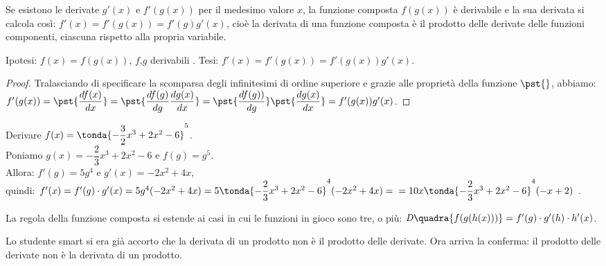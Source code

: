 \begin{teorema}
  \label{teo:diff01_dericomp}
 Se esistono le derivate $g'(x)$ e $f'(g(x))$ per il medesimo valore $x$,
 la funzione composta $f(g(x))$ è derivabile e la sua derivata si calcola
 così: $f'(x)=f'(g(x))=f'(g)g'(x)$, cioè la derivata di una funzione 
composta
 è il prodotto delle derivate delle funzioni componenti, ciascuna rispetto
 alla propria variabile.
\end{teorema}
\noindent Ipotesi: $f(x)=f(g(x))$, $f$,$g$ derivabili .\tab 
Tesi: $f'(x)=f'(g(x))=f'(g(x))g'(x)$.
\begin{proof}
  Tralasciando di specificare la scomparsa degli infinitesimi di ordine 
  superiore e grazie alle proprietà della funzione $\pst{}$, abbiamo:\\
  $f'(g(x))=\pst{\dfrac{df(x)}{dx}}=
  \pst{\dfrac{df(g)}{dg}\dfrac{dg(x)}{dx}}=
  \pst{\dfrac{df(g))}{dg}}\pst{\dfrac{dg(x)}{dx}}=
  f'(g(x))g'(x)$.
\end{proof}
\begin{esempio}
  Derivare $f(x)=\tonda{-\dfrac{3}{2}x^3+2x^2-6}^5$.\\
  Poniamo $g(x)=-\dfrac{2}{3}x^3+2x^2-6$ e $f(g)=g^5$. \\
  Allora: 
  $f'(g)= 5g^4$ e $g'(x)=-2x^2+4x$, \\
  quindi: 
  $f'(x)=f'(g)\cdot g'(x)=5g^4(-2x^2+4x)=
  5\tonda{-\dfrac{2}{3}x^3+2x^2-6}^4(-2x^2+4x)=\\
  =10x\tonda{-\dfrac{2}{3}x^3+2x^2-6}^4(-x+2)$ .
\end{esempio}
\begin{osservazione}
 La regola della funzione composta si estende ai casi in cui le funzioni 
 in gioco sono tre, o più:
 $\mathit{D}\quadra{f(g(h(x)))}=f'(g)\cdot g'(h)\cdot h'(x)$.
\end{osservazione}
\begin{osservazione}
 Lo studente smart si era già accorto che la derivata di un prodotto non 
 è il prodotto delle derivate. Ora arriva la conferma:
 il prodotto delle derivate non è la derivata di un prodotto.
\end{osservazione}


